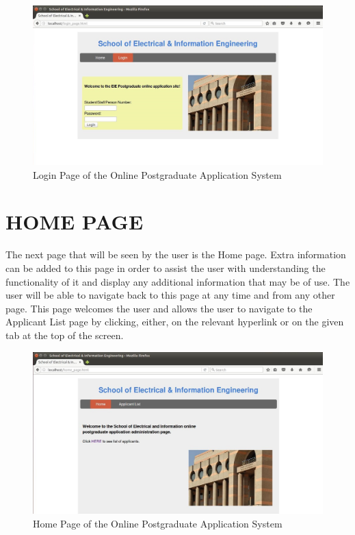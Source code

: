 \documentclass[journal,comsoc,onecolumn]{IEEEtran}
\begin{document}
\begin{figure}[h]
	\centering
	\includegraphics[width=0.7\linewidth]{loginpage}
	\caption{Login Page of the Online Postgraduate Application System}
	\label{fig:loginpage}
\end{figure}


\section{HOME PAGE}
The next page that will be seen by the user is the Home page. Extra information can be added to this page in order to assist the user with understanding the functionality of it and display any additional information that may be of use. The user will be able to navigate back to this page at any time and from any other page. This page welcomes the user and allows the user to navigate to the Applicant List page by clicking, either, on the relevant hyperlink or on the given tab at the top of the screen.
	
\begin{figure}[]
	\centering
	\includegraphics[width=0.7\linewidth]{home}
	\caption{Home Page of the Online Postgraduate Application System}
	\label{fig:home}
\end{figure}
\newpage

\end{document}
